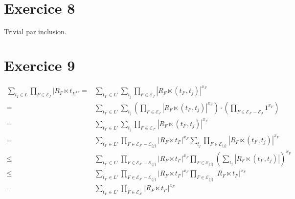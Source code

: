 \documentclass{cours}
\begin{document}
\section{Exercice 8}
Trivial par inclusion. 

\section{Exercice 9}

\begin{equation*}
	\begin{aligned}
		\sum_{t_I \in L} \prod_{F\in\mathcal{E}_{J}} |R_F \ltimes  t_{I|^{x_F}} =& \sum_{t_{I'} \in L'} \sum_{t_j}
    \prod_{F\in\mathcal{E}_J} |R_F \ltimes ( t_{I'}, t_j)|^{x_F}\\
=& \sum_{ t_{I'} \in L'} \sum_{t_j}
    \left(\prod_{F\in\mathcal{E}_J} |R_F \ltimes ( t_{I'}, t_j)|^{x_F}\right) \cdot
    \left(\prod_{F\in\mathcal{E}_{J'}-\mathcal{E}_J} 1^{x_F}\right) \\
=& \sum_{ t_{I'} \in L'} \sum_{t_j}
    \prod_{F\in\mathcal{E}_{J'}} |R_F \ltimes ( t_{I'}, t_j)|^{x_F}\\
=& \sum_{ t_{I'} \in L'} 
    \prod_{F\in\mathcal{E}_{J'}-\mathcal{E}_{\{j\}}} |R_F \ltimes  t_{I'}|^{x_F}
    \sum_{t_j}
    \prod_{F\in\mathcal{E}_{\{j\}}} |R_F \ltimes ( t_{I'}, t_j)|^{x_F}\\
\leq& \sum_{ t_{I'} \in L'} 
    \prod_{F\in\mathcal{E}_{J'}-\mathcal{E}_{\{j\}}} |R_F \ltimes  t_{I'}|^{x_F}
    \prod_{F\in\mathcal{E}_{\{j\}}} 
    \left(\sum_{t_j}
    |R_F \ltimes ( t_{I'}, t_j)|\right)^{x_F}\\
\leq& \sum_{ t_{I'} \in L'} 
    \prod_{F\in\mathcal{E}_{J'}-\mathcal{E}_{\{j\}}} |R_F \ltimes  t_{I'}|^{x_F}
    \prod_{F\in\mathcal{E}_{\{j\}}} 
    |R_F \ltimes  t_{I'}|^{x_F}\\
=& \sum_{ t_{I'} \in L'} \prod_{F\in\mathcal{E}_{J'}} |R_F \ltimes  t_{I'}|^{x_F}
	\end{aligned}
\end{equation*}
\end{document}
